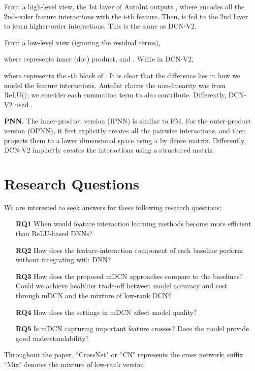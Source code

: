 \documentclass[sigconf]{acmart}
\begin{document}
From a high-level view, the 1st layer of AutoInt outputs , where  encodes all the 2nd-order feature interactions with the i-th feature. Then,  is fed to the 2nd layer to learn higher-order interactions. This is the same as {DCN-V2}. 

From a low-level view (ignoring the residual terms),

where  represents inner (dot) product, and .
While in {DCN-V2}, 

where  represents the -th block of . It is clear that the difference lies in how we model the feature interactions. AutoInt claims the non-linearity was from ReLU(); we consider each summation term to also contribute. Differently, {DCN-V2} used . 

{\bf PNN.} The inner-product version (IPNN) is similar to FM. For the outer-product version (OPNN), it first explicitly creates all the  pairwise interactions,
and then projects them to a lower dimensional space  using a  by  dense matrix. Differently, {DCN-V2} implicitly creates the interactions using a structured matrix.

\section{Research Questions}
\label{sec:research_qs}
We are interested to seek answers for these following research questions:

\begin{itemize}[leftmargin=2.5em]
    \item[\bf RQ1]  When would feature interaction learning methods become more efficient than ReLU-based DNNs? \item[\bf RQ2]  How does the feature-interaction component of each baseline perform without integrating with DNN? 
    \item[\bf RQ3]  How does the proposed mDCN approaches compare to the baselines? Could we achieve healthier trade-off between model accuracy and cost through mDCN and the mixture of low-rank DCN?
    \item[\bf RQ4] How does the settings in mDCN affect model quality?
    \item[\bf RQ5] Is mDCN capturing important feature crosses? Does the model provide good understandability?
\end{itemize}

Throughout the paper, ``CrossNet" or ``CN" represents the cross network; suffix ``Mix" denotes the mixture of low-rank version. 
\end{document}
